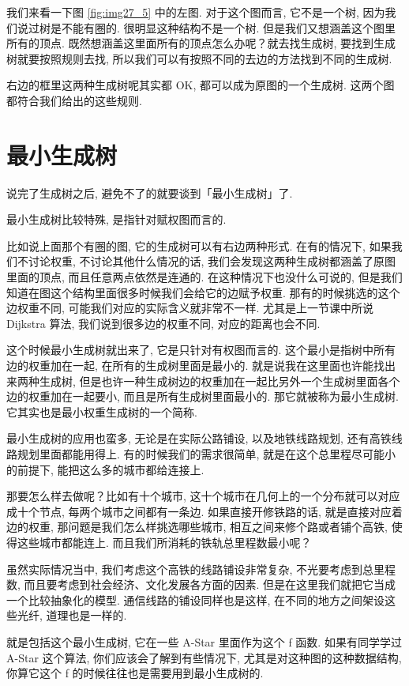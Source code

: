 我们来看一下图 \ref{fig:img27_5} 中的左图. 对于这个图而言, 它不是一个树, 因为我们说过树是不能有圈的. 很明显这种结构不是一个树. 但是我们又想涵盖这个图里所有的顶点. 既然想涵盖这里面所有的顶点怎么办呢？就去找生成树, 要找到生成树就要按照规则去找, 所以我们可以有按照不同的去边的方法找到不同的生成树. 

右边的框里这两种生成树呢其实都 OK, 都可以成为原图的一个生成树. 这两个图都符合我们给出的这些规则. 

\section{最小生成树}

说完了生成树之后, 避免不了的就要谈到「最小生成树」了. 

最小生成树比较特殊, 是指针对赋权图而言的. 

比如说上面那个有圈的图, 它的生成树可以有右边两种形式. 在有的情况下, 如果我们不讨论权重, 不讨论其他什么情况的话, 我们会发现这两种生成树都涵盖了原图里面的顶点, 而且任意两点依然是连通的. 在这种情况下也没什么可说的, 但是我们知道在图这个结构里面很多时候我们会给它的边赋予权重. 那有的时候挑选的这个边权重不同, 可能我们对应的实际含义就非常不一样. 尤其是上一节课中所说 Dijkstra 算法, 我们说到很多边的权重不同, 对应的距离也会不同. 

这个时候最小生成树就出来了, 它是只针对有权图而言的. 这个最小是指树中所有边的权重加在一起, 在所有的生成树里面是最小的. 就是说我在这里面也许能找出来两种生成树, 但是也许一种生成树边的权重加在一起比另外一个生成树里面各个边的权重加在一起要小, 而且是所有生成树里面最小的. 那它就被称为最小生成树. 它其实也是最小权重生成树的一个简称. 

最小生成树的应用也蛮多, 无论是在实际公路铺设, 以及地铁线路规划, 还有高铁线路规划里面都能用得上. 有的时候我们的需求很简单, 就是在这个总里程尽可能小的前提下, 能把这么多的城市都给连接上. 

那要怎么样去做呢？比如有十个城市, 这十个城市在几何上的一个分布就可以对应成十个节点, 每两个城市之间都有一条边. 如果直接开修铁路的话, 就是直接对应着边的权重, 那问题是我们怎么样挑选哪些城市, 相互之间来修个路或者铺个高铁, 使得这些城市都能连上. 而且我们所消耗的铁轨总里程数最小呢？

虽然实际情况当中, 我们考虑这个高铁的线路铺设非常复杂, 不光要考虑到总里程数, 而且要考虑到社会经济、文化发展各方面的因素. 但是在这里我们就把它当成一个比较抽象化的模型. 通信线路的铺设同样也是这样, 在不同的地方之间架设这些光纤, 道理也是一样的. 


就是包括这个最小生成树, 它在一些 A-Star 里面作为这个 f 函数. 如果有同学学过 A-Star 这个算法, 你们应该会了解到有些情况下, 尤其是对这种图的这种数据结构, 你算它这个 f 的时候往往也是需要用到最小生成树的. 

